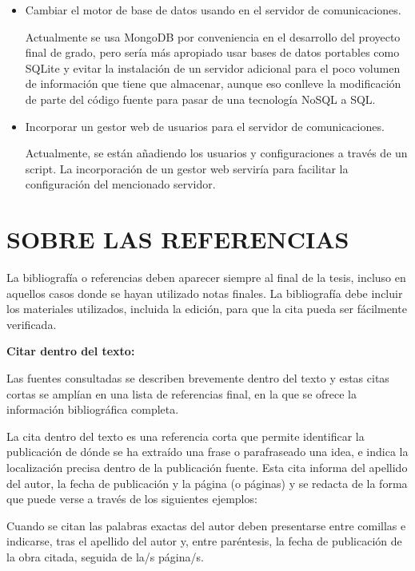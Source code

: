 \documentclass[spanish,12pt, a4paper, twoside]{paper}
\let\oldsection\section
\def\section{\cleardoublepage\oldsection}
\begin{document}
\begin{itemize}
\item Cambiar el motor de base de datos usando en el servidor de comunicaciones. 

Actualmente se usa MongoDB por conveniencia en el desarrollo del proyecto final de grado, pero sería más apropiado usar bases de datos portables como SQLite y evitar la instalación de un servidor adicional para el poco volumen de información que tiene que almacenar, aunque eso conlleve la modificación de parte del código fuente para pasar de una tecnología NoSQL a SQL.

\item Incorporar un gestor web de usuarios para el servidor de comunicaciones.

Actualmente, se están añadiendo los usuarios y configuraciones a través de un script. La incorporación de un gestor web serviría para facilitar la configuración del mencionado servidor.
\end{itemize}

\section{SOBRE LAS REFERENCIAS}

La bibliografía o referencias deben aparecer siempre al final de la tesis, incluso en aquellos casos donde se hayan utilizado notas finales. La bibliografía debe incluir los materiales utilizados, incluida la edición, para que la cita pueda ser fácilmente verificada. 

\bigskip
{\bf Citar dentro del texto:}

Las fuentes consultadas se describen brevemente dentro del texto y estas citas cortas se amplían en una lista de referencias final, en la que se ofrece la información bibliográfica completa. 

La cita dentro del texto es una referencia corta que permite identificar la publicación de dónde se ha extraído una frase o parafraseado una idea, e indica la localización precisa dentro de la publicación fuente. Esta cita informa del apellido del autor, la fecha de publicación y la página (o páginas) y se redacta de la forma que puede verse a través de los siguientes ejemplos:

Cuando se citan las palabras exactas del autor deben presentarse entre comillas e indicarse, tras el apellido del autor y, entre paréntesis, la fecha de publicación de la obra citada, seguida de la/s página/s.
\end{document}

